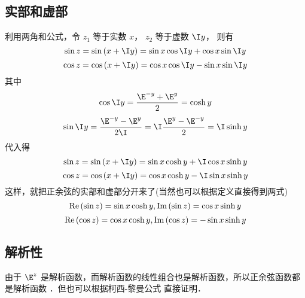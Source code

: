 \subsection{实部和虚部}
利用两角和公式，令 ${z_1}$ 等于实数 $x$，  ${z_2}$ 等于虚数 $\I y$， 则有
 \begin{equation}
\sin z = \sin \left( {x + \I y} \right) = \sin x\cos \I y + \cos x\sin \I y
\end{equation} 
\begin{equation}
\cos z = \cos \left( {x + \I y} \right) = \cos x\cos \I y - \sin x\sin \I y
\end{equation} 
其中
\begin{equation}
\cos \I y = \frac{{{\E^{ - y}} + {\E^y}}}{2} = \cosh y
\end{equation} 
\begin{equation}
\sin \I y = \frac{{{\E^{ - y}} - {\E^y}}}{{2\I}} = \I\frac{{{\E^y} - {\E^{ - y}}}}{2} = \I\sinh y
\end{equation} 
代入得
\begin{equation}
\sin z = \sin \left( {x + \I y} \right) = \sin x\cosh y + \I\cos x\sinh y
\end{equation} 
\begin{equation}
\cos z = \cos \left( {x + \I y} \right) = \cos x\cosh y - \I\sin x\sinh y
\end{equation}  
这样，就把正余弦的实部和虚部分开来了(当然也可以根据定义直接得到两式)
\begin{equation}
{\mathop{\rm Re}\nolimits} \left( {\sin z} \right) = \sin x\cosh y,{\mathop{\rm Im}\nolimits} \left( {\sin z} \right) = \cos x\sinh y
\end{equation} 
\begin{equation}
{\mathop{\rm Re}\nolimits} \left( {\cos z} \right) = \cos x\cosh y,{\mathop{\rm Im}\nolimits} \left( {\cos z} \right) =  - \sin x\sinh y
\end{equation}
\subsection{解析性}
由于 ${\E^z}$ 是解析函数，而解析函数的线性组合也是解析函数，所以正余弦函数都是解析函数%
．但也可以根据柯西-黎曼公式%
直接证明．






















